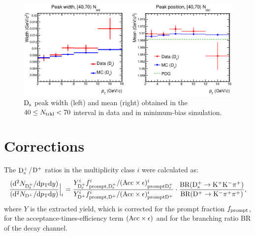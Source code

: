 \begin{figure}[htpb]
\centering
 \includegraphics[width=1\textwidth]{FigCap6/DsMeanSigma_DataMC_4070_Ntrkl.eps}
  \caption{${\rm D_s}$ peak width (left) and mean (right) obtained in the $40 \leq N_{\rm trkl} < 70$ interval in data and in minimum-bias simulation.}
 \label{fig:DsFitParamsVsNtrkl}
\end{figure}

\section{Corrections}
\label{sec:Corrections}
The ${\rm D_s^+}$/${\rm D^+}$ ratios in the multiplicity class $i$ were calculated
as:
\begin{equation} 
\label{eq:NtrklCorr}
 \frac{({\rm d}^2N_{{\rm D_s^+}}/{\rm d}p_{\rm T} {\rm d}y)}{({\rm d}^2N_{{\rm D^+}}/{\rm d}p_{\rm T} {\rm d}y)} \Big |_i = \frac{Y^i_{{\rm D_s^+}}  f^i_{\rm prompt, {\rm D_s^+}} / ({\rm Acc} \times \epsilon)^i_{\rm prompt {\rm D_s^+}}}{Y^i_{{\rm D^+}}  f^i_{\rm prompt, {\rm D^+}} / ({\rm Acc} \times \epsilon)^i_{\rm prompt {\rm D^+}}} \cdot \frac{\rm BR({\rm D^{+}_\mathrm{s}\to K^+ K^-\pi^+})}{\rm BR({\rm D}^+\to {\rm K}^-\pi^+\pi^+)},
\end{equation}
where $Y$ is the extracted yield, which is corrected for the prompt fraction
$f_{\rm prompt}$, for the acceptance-times-efficiency term $({\rm Acc} \times \epsilon)$ and for
the branching ratio BR of the decay channel.\\




